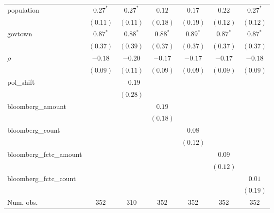 \begin{table}[!h]
\begin{center}
\begin{tabular}{l c c c c c c }
population              & $0.27^{*}$   & $0.27^{*}$   & $0.12$       & $0.17$       & $0.22$       & $0.27^{*}$   \\
                        & $(0.11)$     & $(0.11)$     & $(0.18)$     & $(0.19)$     & $(0.12)$     & $(0.12)$     \\
govtown                 & $0.87^{*}$   & $0.88^{*}$   & $0.88^{*}$   & $0.89^{*}$   & $0.87^{*}$   & $0.87^{*}$   \\
                        & $(0.37)$     & $(0.39)$     & $(0.37)$     & $(0.37)$     & $(0.37)$     & $(0.37)$     \\
$\rho$                  & $-0.18$      & $-0.20$      & $-0.17$      & $-0.17$      & $-0.17$      & $-0.18$      \\
                        & $(0.09)$     & $(0.11)$     & $(0.09)$     & $(0.09)$     & $(0.09)$     & $(0.09)$     \\
pol\_shift              &              & $-0.19$      &              &              &              &              \\
                        &              & $(0.28)$     &              &              &              &              \\
bloomberg\_amount       &              &              & $0.19$       &              &              &              \\
                        &              &              & $(0.18)$     &              &              &              \\
bloomberg\_count        &              &              &              & $0.08$       &              &              \\
                        &              &              &              & $(0.12)$     &              &              \\
bloomberg\_fctc\_amount &              &              &              &              & $0.09$       &              \\
                        &              &              &              &              & $(0.12)$     &              \\
bloomberg\_fctc\_count  &              &              &              &              &              & $0.01$       \\
                        &              &              &              &              &              & $(0.19)$     \\
\midrule
Num. obs.               & 352          & 310          & 352          & 352          & 352          & 352          \\

\end{tabular}
\end{center}
\end{table}
